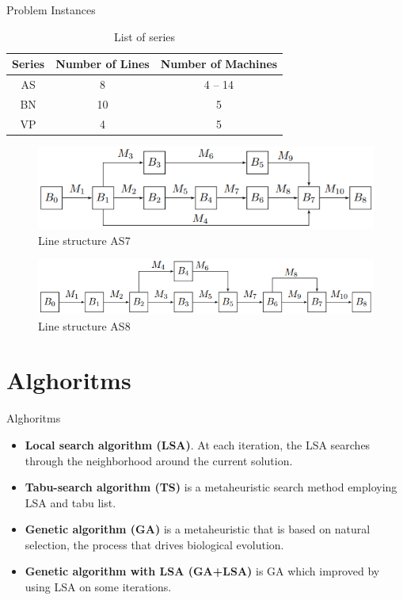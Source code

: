 \documentclass[aspectratio=169,xcolor=dvipsnames]{beamer}
\begin{document}

\begin{frame}{Problem Instances}
\begin{table}[!ht]
\centering
\small
\begin{tabular}{|c|c|c|}
\hline
 \textbf{Series}& \textbf{Number of Lines}& \textbf{Number of Machines}\\
\hline
AS & 8 & 4 -- 14 \\
BN & 10 & 5 \\
VP & 4 & 5 \\
\hline
\end{tabular}
\caption{List of series}\label{tabl:series}
\end{table}
\vspace{-0.2cm}	
 \begin{figure}[h!]
	\centering
	\includegraphics[scale=0.6]{ans7}
\vspace{-0.3cm}	
  \caption{Line structure AS7} \label{fig:vis_as7}
  \end{figure}
\vspace{-0.2cm}	
 \begin{figure}[h!]
	\centering
	\includegraphics[scale=0.55]{ans8}
	\vspace{-0.3cm}
  \caption{Line structure AS8} \label{fig:vis_as8}
  \end{figure}
\end{frame}

\section{Alghoritms}

\begin{frame}{Alghoritms}
\begin{itemize}
\item \textbf{Local search algorithm (LSA)}. At each iteration, the LSA searches through the neighborhood around the current solution.
\item \textbf{Tabu-search algorithm (TS)} is a metaheuristic search method employing LSA and tabu list.
\item \textbf{Genetic algorithm (GA)} is a metaheuristic that is based on natural selection, the process that drives biological evolution.
\item \textbf{Genetic algorithm with LSA (GA+LSA)} is GA which improved by using LSA on some iterations.
\end{itemize}
\end{frame}
\end{document}
